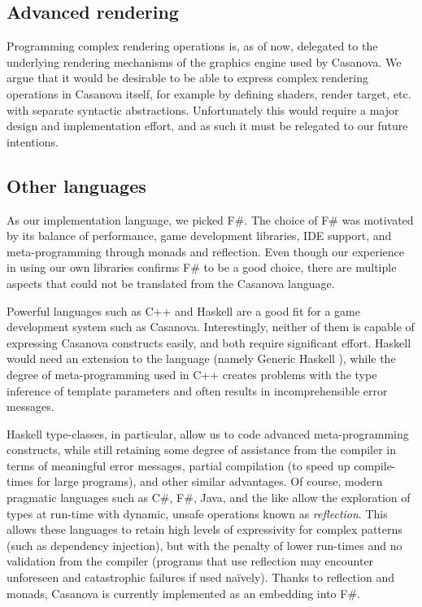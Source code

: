 \subsection{Advanced rendering}
Programming complex rendering operations is, as of now, delegated to the underlying rendering mechanisms of the graphics engine used by Casanova. We argue that it would be desirable to be able to express complex rendering operations in Casanova itself, for example by defining shaders, render target, etc. with separate syntactic abstractions. Unfortunately this would require a major design and implementation effort, and as such it must be relegated to our future intentions.

\subsection{Other languages}
As our implementation language, we picked F\#. The choice of F\# was motivated by its balance of performance, game development libraries, IDE support, and meta-programming through monads and reflection. Even though our experience in using our own libraries confirms F\# to be a good choice, there are multiple aspects that could not be translated from the Casanova language. 

Powerful languages such as C++ and Haskell are a good fit for a game development system such as Casanova. Interestingly, neither of them is capable of expressing Casanova constructs easily, and both require significant effort. Haskell would need an extension to the language (namely Generic Haskell \cite{APPENDIX_E_GENERIC_HASKELL}), while the degree of meta-programming used in C++ creates problems with the type inference of template parameters and often results in incomprehensible error messages. 

Haskell type-classes, in particular, allow us to code advanced meta-programming constructs, while still retaining some degree of assistance from the compiler in terms of meaningful error messages, partial compilation (to speed up compile-times for large programs), and other similar advantages. Of course, modern pragmatic languages such as C\#, F\#, Java, and the like allow the exploration of types at run-time with dynamic, unsafe operations known as \textit{reflection}. This allows these languages to retain high levels of expressivity for complex patterns (such as dependency injection), but with the penalty of lower run-times and no validation from the compiler (programs that use reflection may encounter unforeseen and catastrophic failures if used naïvely). Thanks to reflection and monads, Casanova is currently implemented as an embedding into F\#.

